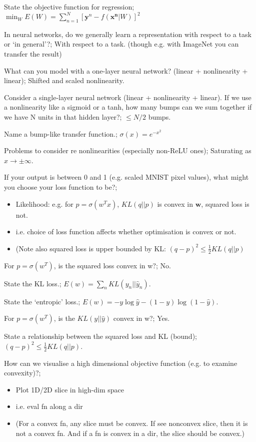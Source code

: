 \documentclass{article}
\begin{document}
State the objective function for regression; $\min_W E(W) = \sum_{n=1}^N [\mathbf{y}^n - f(\mathbf{x^n}|W)]^2$

In neural networks, do we generally learn a representation with respect to a task or `in general'?; With respect to a task. (though e.g. with ImageNet you can transfer the result)

What can you model with a one-layer neural network? (linear + nonlinearity + linear); Shifted and scaled nonlinearity.

Consider a single-layer neural network (linear + nonlinearity + linear).  If we use a nonlinearity like a sigmoid or a tanh, how many bumps can we sum together if we have N units in that hidden layer?; $\leq N/2$ bumps.

Name a bump-like transfer function.; $\sigma(x) = e^{-x^2}$

Problems to consider re nonlinearities (especially non-ReLU ones); Saturating as $x\rightarrow \pm\infty$.

If your output is between 0 and 1 (e.g. scaled MNIST pixel values), what might you choose your loss function to be?; \begin{itemize} \item Likelihood: e.g. for $p=\sigma(w^Tx)$, $KL(q||p)$ is convex in $\mathbf{w}$, squared loss is not. \item i.e. choice of loss function affects whether optimisation is convex or not. \item (Note also squared loss is upper bounded by KL: $(q-p)^2 \leq \frac{1}{2}KL(q||p)$ \end{itemize}

For $p=\sigma(w^T)$, is the squared loss convex in w?; No.

State the KL loss.; $E(w) = \sum_n KL(y_n||\hat{y}_n)$.

State the `entropic' loss.; $E(w) = -y\log\hat{y} - (1-y)\log(1-\hat{y})$.

For $p=\sigma(w^T)$, is the $KL(y||\hat{y})$ convex in w?; Yes.

State a relationship between the squared loss and KL (bound); $(q-p)^2 \leq \frac{1}{2}KL(q||p)$.

How can we visualise a high dimensional objective function (e.g. to examine convexity)?; \begin{itemize} \item Plot 1D/2D slice in high-dim space \item i.e. eval fn along a dir \item (For a convex fn, any slice must be convex. If see nonconvex slice, then it is not a convex fn. And if a fn is convex in a dir, the slice should be convex.) \end{itemize}
\end{document}
